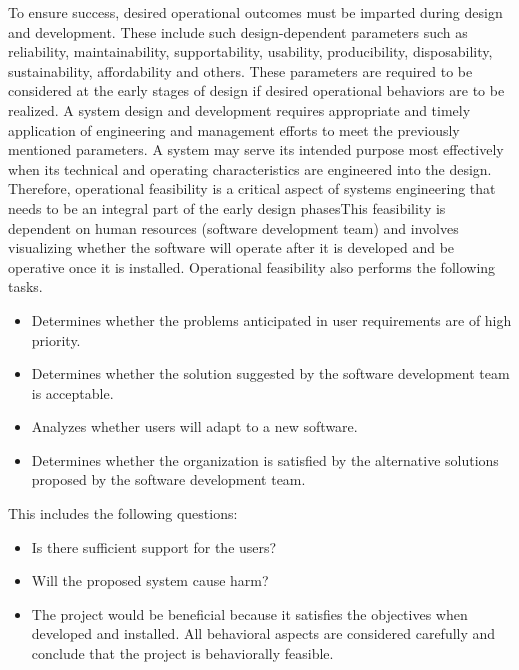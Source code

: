 To ensure success, desired operational outcomes must be imparted during design and development. These include such design-dependent parameters such as reliability, maintainability, supportability, usability, producibility, disposability, sustainability, affordability and others. These parameters are required to be considered at the early stages of design if desired operational behaviors are to be realized. A system design and development requires appropriate and timely application of engineering and management efforts to meet the previously mentioned parameters. A system may serve its intended purpose most effectively when its technical and operating characteristics are engineered into the design. Therefore, operational feasibility is a critical aspect of systems engineering that needs to be an integral part of the early design phasesThis feasibility is dependent on human resources (software development team) and involves visualizing whether the software will operate after it is developed and be operative once it is installed. Operational feasibility also performs the following tasks.

\begin{itemize}
	\item Determines whether the problems anticipated in user requirements are of high priority.
	\item Determines whether the solution suggested by the software development team is acceptable.
	\item Analyzes whether users will adapt to a new software.
	\item Determines whether the organization is satisfied by the alternative solutions proposed by the software development team.
\end{itemize}

This includes the following questions:
\begin{itemize}
	\item Is there sufficient support for the users?
	\item Will the proposed system cause harm?
	\item The project would be beneficial because it satisfies the objectives when developed and installed. All behavioral aspects are considered carefully and conclude that the project is behaviorally feasible.
\end{itemize}
\newpage

